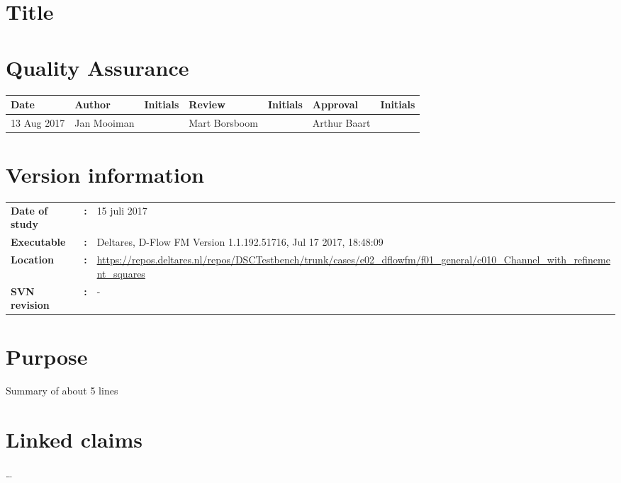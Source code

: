 \section{Title}
\newrefsegment

\section*{Quality Assurance}
{{\footnotesize
\begin{tabular}{p{22mm-2pt}@{}p{27mm-2pt}@{}p{18mm}@{}p{27mm-2pt}@{}p{18mm}@{}p{27mm-2pt}@{}p{\textwidth-139mm-1pt}} \hline
    \rowcolor{dgrey4}
\textbf{Date} & \textbf{Author} & \textbf{Initials} & \textbf{Review} & \textbf{Initials} & \textbf{Approval} & \textbf{Initials}  \\ \hline
13 Aug 2017 & Jan Mooiman & & Mart Borsboom & & Arthur Baart &   \\ \hline
  \end{tabular}
}}

\section*{Version information}
\begin{tabular}{@{}p{23mm}@{}p{0mm}p{\textwidth-23mm-30pt}}
\textbf{Date of study}& \textbf{:} & 15 juli 2017 \\
\textbf{Executable}   & \textbf{:} & Deltares, D-Flow FM Version 1.1.192.51716, Jul 17 2017, 18:48:09 \\
\textbf{Location}     & \textbf{:} & \url{https://repos.deltares.nl/repos/DSCTestbench/trunk/cases/e02_dflowfm/f01_general/c010_Channel_with_refinement_squares} \\ 
\textbf{SVN revision} & \textbf{:} & -
\end{tabular}

\section*{Purpose}
Summary of about 5 lines

\section*{Linked claims}
\ldots

